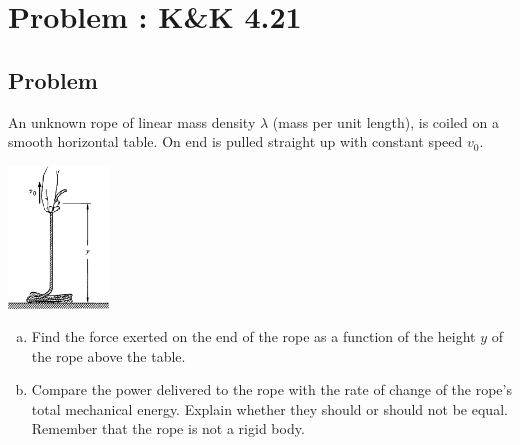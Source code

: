 \documentclass[solutions]{esg8012pset}
\date{October 22}
\begin{document}
\section{Problem \thesection: K\&K 4.21}
\subsection{Problem}
  An unknown rope of linear mass density $\lambda$ (mass per unit length), is coiled on a smooth horizontal table. On end is pulled straight up with constant speed $v_0$.
  \begin{center}\includegraphics[width=0.2\textwidth]{ps07_1}\end{center}
  \begin{enumerate}[(a)]
  \item Find the force exerted on the end of the rope as a function of the height $y$ of the rope above the table.
    \item Compare the power delivered to the rope with the rate of change of the rope's total mechanical energy. Explain whether they should or should not be equal. Remember that the rope is not a rigid body.
  \end{enumerate}
\end{document}
